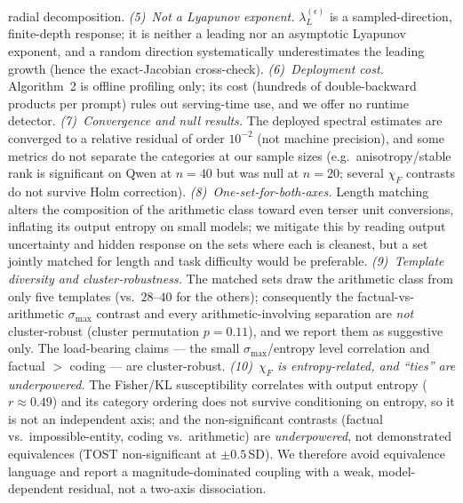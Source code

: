 \documentclass{article}
\begin{document}
radial decomposition. \emph{(5)~Not a Lyapunov exponent.}
$\lambda_L^{(\epsilon)}$ is a sampled-direction, finite-depth response; it is neither a leading nor an
asymptotic Lyapunov exponent, and a random direction systematically underestimates the leading
growth (hence the exact-Jacobian cross-check). \emph{(6)~Deployment cost.} Algorithm~2 is offline
profiling only; its cost (hundreds of double-backward products per prompt) rules out serving-time
use, and we offer no runtime detector. \emph{(7)~Convergence and null results.} The deployed
spectral estimates are converged to a relative residual of order $10^{-2}$ (not machine precision),
and some metrics do not separate the categories at our sample sizes (e.g.\ anisotropy/stable rank is
significant on Qwen at $n{=}40$ but was null at $n{=}20$; several $\chi_F$ contrasts do not survive
Holm correction). \emph{(8)~One-set-for-both-axes.} Length matching alters the composition of the
arithmetic class toward even terser unit conversions, inflating its output entropy on small models; we mitigate
this by reading output uncertainty and hidden response on the sets where each is cleanest, but a set
jointly matched for length and task difficulty would be preferable. \emph{(9)~Template diversity and
cluster-robustness.} The matched sets draw the arithmetic class from only five templates (vs.\
$28$--$40$ for the others); consequently the factual-vs-arithmetic $\sigma_{\max}$ contrast and every
arithmetic-involving separation are \emph{not} cluster-robust (cluster permutation $p=0.11$), and we
report them as suggestive only. The load-bearing claims --- the small $\sigma_{\max}$/entropy level
correlation and factual $>$ coding --- are cluster-robust. \emph{(10)~$\chi_F$ is entropy-related, and ``ties''
are underpowered.} The Fisher/KL susceptibility correlates with output entropy ($r\approx0.49$) and
its category ordering does not survive conditioning on entropy, so it is not an independent axis; and
the non-significant contrasts (factual vs.\ impossible-entity, coding vs.\ arithmetic) are
\emph{underpowered}, not demonstrated equivalences (TOST non-significant at $\pm0.5$\,SD). We
therefore avoid equivalence language and report a magnitude-dominated coupling with a weak,
model-dependent residual, not a two-axis dissociation.
\end{document}
